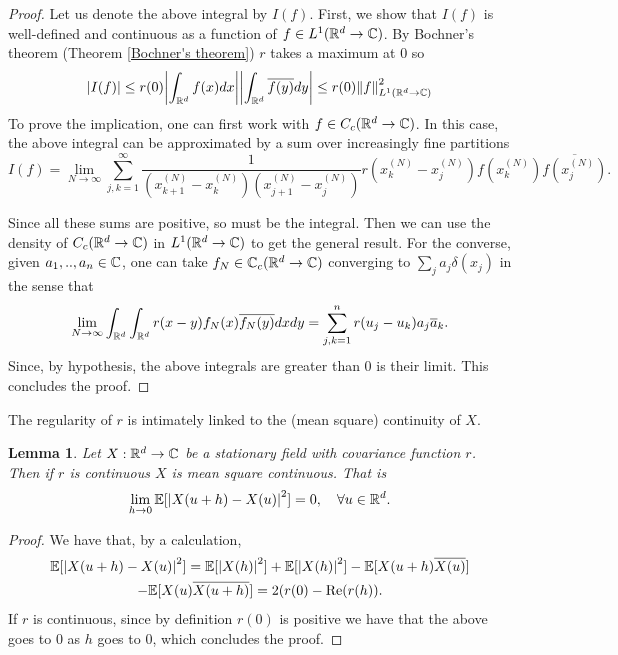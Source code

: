 \documentclass[12pt]{article}
\newtheorem{lemma}{Lemma}
\begin{document}
\begin{proof}
	Let us denote the above integral by $I(f)$. First, we show that $I(f)$ is well-defined and continuous as a function of $f \in L^1({\mathbb R}^d\to\mathbb{C})$. By Bochner's theorem (Theorem \ref{Bochner's theorem}) $r$ takes a maximum at  $0$ so
	\begin{equation*}
		\abs{I(f)}\leq r(0)\abs{\int_{{\mathbb R}^d}f(x)dx}\abs{\int_{{\mathbb R}^d}\overline{f(y)}dy}\leq r(0)\norm{f}_{L^1({\mathbb R}^d\to \mathbb{C})}^2
	\end{equation*}
	To prove the implication, one can first work with  $f\in C_c({\mathbb R}^d\to\mathbb{C})$. In this case, the above integral can be approximated by a sum over increasingly fine partitions
	\begin{equation*}
		I(f)=\lim_{N\to\infty}\sum_{j,k=1}^\infty\frac{1}{(x_{k+1}^{(N)}-x_k^{(N)})(x_{j+1}^{(N)}-x_j^{(N)})} r(x^{(N)}_k-x^{(N)}_j)f(x^{(N)}_k)\overline{f(x^{(N)}_j)}.
	\end{equation*}

	Since all these sums are positive, so must be the integral. Then we can use the density of $C_c({\mathbb R}^d\to\mathbb{C})$ in $L^1({\mathbb R}^d\to\mathbb{C})$ to get the general result. For the converse, given $a_1,..,a_n\in \mathbb{C}$, one can take $f_N\in\mathbb{C}_c({\mathbb R}^d\to \mathbb{C})$ converging to  $\sum_{j}a_j \delta(x_j)$ in the sense that
	\begin{equation*}
		\lim_{N\to\infty}\int_{{\mathbb R}^d}\int_{{\mathbb R}^d} r(x-y)f_N(x)\overline{f_N(y)}dx dy=
		\sum_{j,k=1}^{n} r(u_j-u_k)a_j\overline{a}_k.
	\end{equation*}
	Since, by hypothesis, the above integrals are greater than $0$ is their limit. This concludes the proof.
\end{proof}
The regularity of $r$ is intimately linked to the (mean square) continuity of $X$.
\begin{lemma}
	Let  $X:{\mathbb R}^d\to\mathbb{C} $ be a stationary field with covariance function $r$. Then if $r$ is continuous $X$ is mean square continuous. That is
	\begin{equation*}
		\lim_{h\to 0}\mathbb{E}[\abs{{X(u+h)-X(u)}}^2]=0,\quad\forall u\in{\mathbb R}^d.
	\end{equation*}
\end{lemma}
\begin{proof}
	We have that, by a calculation,
	\begin{multline*}
		\mathbb{E}[\abs{{X(u+h)-X(u)}}^2]=\mathbb{E}[\abs{X(h)}^2]+\mathbb{E}[\abs{X(h)}^2]-\mathbb{E}[X(u+h)\overline{X(u)}]\\-\mathbb{E}[X(u)\overline{X(u+h)}]=2(r(0)-\Re(r(h)).
	\end{multline*}
	If $r$ is continuous, since by definition $r(0)$ is positive we have that the above goes to $0$ as $h$ goes to $0$, which concludes the proof.
\end{proof}
\end{document}
